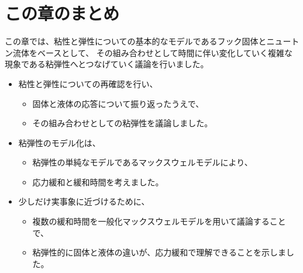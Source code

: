 \documentclass[uplatex,dvipdfmx,a4paper,11pt]{jsarticle}
\begin{document}
\section*{この章のまとめ}
この章では、粘性と弾性についての基本的なモデルであるフック固体とニュートン流体をベースとして、
その組み合わせとして時間に伴い変化していく複雑な現象である粘弾性へとつなげていく議論を行いました。
\begin{boxnote}
    \begin{itemize}
        \item 粘性と弾性についての再確認を行い、
            \begin{itemize}
                \item 固体と液体の応答について振り返ったうえで、
                \item その組み合わせとしての粘弾性を議論しました。
            \end{itemize} 
        \item 粘弾性のモデル化は、
            \begin{itemize}
                \item 粘弾性の単純なモデルであるマックスウェルモデルにより、
                \item 応力緩和と緩和時間を考えました。
            \end{itemize} 
        \item 少しだけ実事象に近づけるために、
            \begin{itemize}
                \item 複数の緩和時間を一般化マックスウェルモデルを用いて議論することで、
                \item 粘弾性的に固体と液体の違いが、応力緩和で理解できることを示しました。
            \end{itemize}
    \end{itemize}
\end{boxnote}

\newpage
\end{document}
